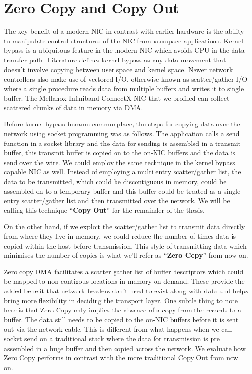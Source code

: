 \section{Zero Copy and Copy Out}
The key benefit of a modern NIC in contrast with earlier hardware is the ability to manipulate control structures of the NIC from userspace applications. 
Kernel bypass is a ubiquitous feature in the modern NIC which avoids CPU in the data transfer path. Literature defines kernel-bypass as any data movement that doesn't 
involve copying between user space and kernel space. Newer network controllers also make use of vectored I/O, otherwise known as scatter/gather I/O
where a single procedure reads data from multiple buffers and writes it to single buffer. The Mellanox Infiniband ConnectX
NIC that we profiled can collect scattered chunks of data in memory via DMA.

Before kernel bypass became commonplace, the steps for copying data over the network using socket programming was as follows. 
The application calls a send function in a socket library and the data for sending is assembled 
in a transmit buffer, this transmit buffer is copied on to the on-NIC buffers and the data is 
send over the wire. We could employ the same technique in the kernel bypass capable NIC as well.
Instead of employing a multi entry scatter/gather list, the data to be transmitted, which could be discontiguous in memory, could be assembled on 
to a temporary buffer and this buffer could be treated as a single entry scatter/gather list
and then transmitted over the network. We will be calling this technique \enquote{\textbf{Copy Out}} for the remainder of the thesis. 

On the other hand, if we exploit the scatter/gather list to 
transmit data directly from where they live in memory, we could reduce the number of times data is copied within the host before transmission. This style of transmitting data which minimises 
the number of copies is what we'll refer as \enquote{\textbf{Zero Copy}} from now on.



Zero copy DMA facilitates a scatter gather list of buffer descriptors
which could be mapped to non contigous locations in memory on demand. These provide
the added benefit that network headers don't need to exist along with data and helps bring more flexibility 
in deciding the transport layer. One subtle thing to note here is that Zero Copy only implies the absence 
of a copy from the records to a buffer. The data still needs to be copied to the on-NIC buffers before 
it is sent out via the network cable. This is different from what happens when we call socket send on a traditional stack where the data for transmission is pre assembled in a huge buffer and then copied across the network.
We evaluate how Zero Copy performs in contrast with the more traditional Copy Out from now on.

